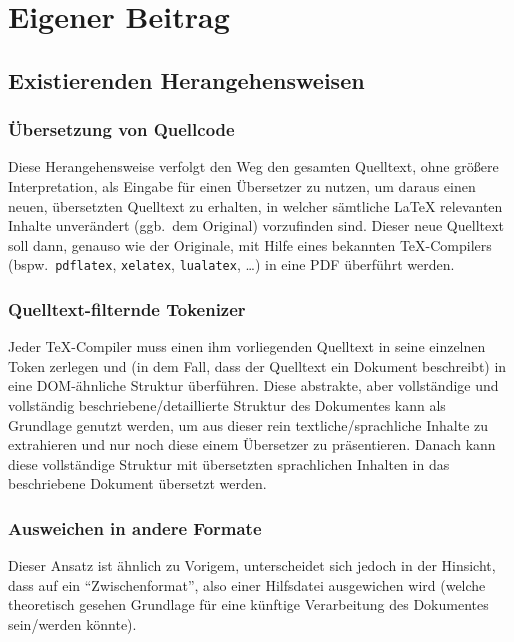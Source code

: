 \section{Eigener Beitrag}%
\subsection{Existierenden Herangehensweisen}%
\subsubsection{Übersetzung von Quellcode}
Diese Herangehensweise verfolgt den Weg den gesamten Quelltext, ohne größere Interpretation, als Eingabe für einen Übersetzer zu nutzen, um daraus einen neuen, übersetzten Quelltext zu erhalten, in welcher sämtliche \LaTeX{} relevanten Inhalte unverändert (ggb.\ dem Original) vorzufinden sind. Dieser neue Quelltext soll dann, genauso wie der Originale, mit Hilfe eines bekannten \TeX{}-Compilers (bspw.\ \texttt{pdflatex}, \texttt{xelatex}, \texttt{lualatex}, \ldots) in eine PDF überführt werden.

\subsubsection{Quelltext-filternde Tokenizer}\label{contrib:existing:tokenizer}%
Jeder \TeX{}-Compiler muss einen ihm vorliegenden Quelltext in seine einzelnen Token zerlegen und (in dem Fall, dass der Quelltext ein Dokument beschreibt) in eine DOM-ähnliche Struktur überführen. Diese abstrakte, aber vollständige und vollständig beschriebene/detaillierte Struktur des Dokumentes kann als Grundlage genutzt werden, um aus dieser rein textliche/sprachliche Inhalte zu extrahieren und nur noch diese einem Übersetzer zu präsentieren. Danach kann diese vollständige Struktur mit übersetzten sprachlichen Inhalten in das beschriebene Dokument übersetzt werden.

\subsubsection{Ausweichen in andere Formate}
Dieser Ansatz ist ähnlich zu Vorigem, unterscheidet sich jedoch in der Hinsicht, dass auf ein \enquote{Zwischenformat}, also einer Hilfsdatei ausgewichen wird (welche theoretisch gesehen Grundlage für eine künftige Verarbeitung des Dokumentes sein/werden könnte).

